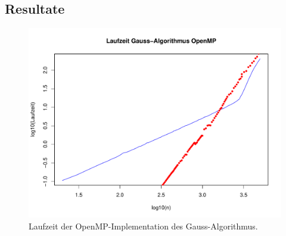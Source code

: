 \subsection{Resultate}
\begin{figure}
\begin{center}
\includegraphics[width=\hsize]{images/gauss-openmp.pdf}
\end{center}
\caption{Laufzeit der OpenMP-Implementation des Gauss-Algorithmus.
\label{openmp-results}}
\end{figure}

